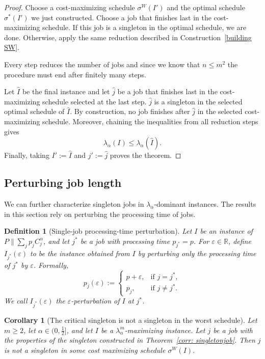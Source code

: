 \documentclass[%
english, titlepage=false %
]{./tum-templates/book/tumbook}
\newtheorem{corollary}{Corollary}
\newtheorem{definition}{Definition}
\begin{document}
\begin{proof}
Choose a cost-maximizing schedule $\sigma^W(I')$ and the 
optimal schedule $\sigma^*(I')$ we just constructed. Choose a job that finishes 
last in the cost-maximizing schedule.
If this job is a singleton in the optimal schedule, we are done. Otherwise,
apply the same reduction described in Construction~\ref{building SW}.\medskip

Every step reduces the number of jobs and since we know that $n\le m^2$ the procedure must end
after finitely many steps.

Let $\widehat I$ be the final instance and let $\widehat j$ be a job that
finishes last in the cost-maximizing schedule selected at the last step.
$\widehat j$ is a singleton in the selected optimal
schedule of $\widehat I$. By construction, no job finishes after $\widehat j$ in
the selected cost-maximizing schedule. Moreover, chaining the inequalities
from all reduction steps gives
\[
    \lambda_\alpha(I)\leq\lambda_\alpha(\widehat I).
\]
Finally, taking $I':=\widehat I$ and $j':=\widehat j$ proves the theorem.
\end{proof}


\noindent
\subsection*{Perturbing job length}
We can further characterize singleton jobs in $\lambda_{\alpha}$-dominant instances.
The results in this section rely on perturbing the processing time of jobs.
\begin{definition}[Single-job processing-time perturbation]\label{def:singleojobperturbation}
Let $I$ be an instance of
$P \!\parallel\! \sum_j p_jC_j^{\alpha}$, and let $j^*$ be a job with
processing time $p_{j^*}=p $. For $\varepsilon \in \mathbb{R}$, define
\(I_{j^*}(\varepsilon)\) to be the instance obtained from \(I\) by perturbing
only the processing time of \(j^*\) by \(\varepsilon\). Formally,
\[
p_j(\varepsilon)
:=
\begin{cases}
p+\varepsilon, & \text{if } j=j^*,\\
p_j,           & \text{if } j\neq j^*.
\end{cases}
\]
We call $I_{j^*}(\varepsilon)$ the $\varepsilon$-perturbation of $I$ at $j^*$.
\end{definition}

\begin{corollary}[The critical singleton is not a singleton in the worst schedule]
\label{corr:singleton-not-worst}
Let $m\geq2$, let $\alpha\in\Big(0,\frac12\Big]$, and let $I$ be a
$\lambda_\alpha^m$-maximizing instance. Let $j$ be a job with the
properties of the singleton constructed in
Theorem~\ref{corr: singletonjob}. Then $j$ is not a singleton in some cost maximizing schedule
$\sigma^W(I)$.
\end{corollary}
\end{document}

